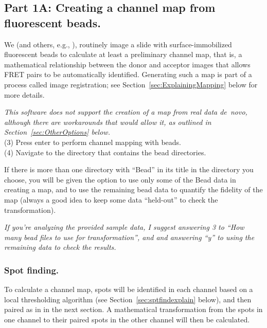 \documentclass[11pt]{article}
\begin{document}
\subsection{Part 1A: Creating a channel map from fluorescent beads.}

We (and others, e.g., \cite{Deindl2012}), routinely image a slide with surface-immobilized fluorescent beads to calculate at least a preliminary channel map, that is, a mathematical relationship between the donor and acceptor images that allows FRET pairs to be automatically identified. Generating such a map is part of a process called image registration; see Section~\ref{sec:ExplainingMapping} below for more details. 

{\it This software does not support the creation of a map from real data de~novo, although there are workarounds that would allow it, as outlined in Section~\ref{sec:OtherOptions} below.}\\ 

\noindent (3) Press enter to perform channel mapping with beads.\\

\noindent (4) Navigate to the directory that contains the bead directories. 

If there is more than one directory with ``Bead'' in its title in the directory you choose, you will be given the option to use only some of the Bead data in creating a map, and to use the remaining bead data to quantify the fidelity of the map (always a good idea to keep some data ``held-out'' to check the transformation). 

{\it If you're analyzing the provided sample data, I suggest answering 3 to ``How many bead files to use for transformation'', and and answering ``y'' to using the remaining data to check the results.}

\subsubsection{Spot finding.}\label{sec:SptFindBds}

To calculate a channel map, spots will be identified in each channel based on a local thresholding algorithm (see Section~\ref{sec:sptfindexplain} below), and then paired as in in the next section. A mathematical transformation from the spots in one channel to their paired spots in the other channel will then be calculated.
\end{document}
